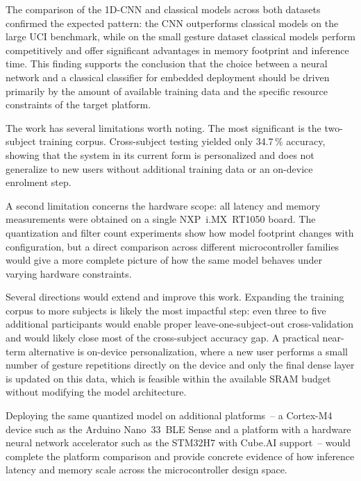The comparison of the 1D-CNN and classical models across both datasets confirmed the expected pattern: the CNN outperforms classical models on the large UCI benchmark, while on the small gesture dataset classical models perform competitively and offer significant advantages in memory footprint and inference time. This finding supports the conclusion that the choice between a neural network and a classical classifier for embedded deployment should be driven primarily by the amount of available training data and the specific resource constraints of the target platform.

The work has several limitations worth noting. The most significant is the two-subject training corpus. Cross-subject testing yielded only 34.7\,\% accuracy, showing that the system in its current form is personalized and does not generalize to new users without additional training data or an on-device enrolment step. 

A second limitation concerns the hardware scope: all latency and memory measurements were obtained on a single NXP~i.MX~RT1050 board. The quantization and filter count experiments show how model footprint changes with configuration, but a direct comparison across different microcontroller families would give a more complete picture of how the same model behaves under varying hardware constraints.

Several directions would extend and improve this work. Expanding the training corpus to more subjects is likely the most impactful step: even three to five additional participants would enable proper leave-one-subject-out cross-validation and would likely close most of the cross-subject accuracy gap. A practical near-term alternative is on-device personalization, where a new user performs a small number of gesture repetitions directly on the device and only the final dense layer is updated on this data, which is feasible within the available SRAM budget without modifying the model architecture.

Deploying the same quantized model on additional platforms~-- a Cortex-M4 device such as the Arduino Nano~33~BLE Sense and a platform with a hardware neural network accelerator such as the STM32H7 with Cube.AI support~-- would complete the platform comparison and provide concrete evidence of how inference latency and memory scale across the microcontroller design space.
